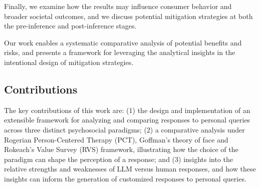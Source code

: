 Finally, we examine how the results may influence consumer behavior and broader societal outcomes, and we discuss potential mitigation strategies at both the pre-inference and post-inference stages.





Our work enables a systematic comparative analysis of potential benefits and risks, and presents a framework for leveraging the analytical insights in the intentional design of mitigation strategies.

\subsection{Contributions}
The key contributions of this work are: (1) the design and implementation of an extensible framework for analyzing and comparing responses to personal queries across three distinct psychosocial paradigms; (2) a comparative analysis under Rogerian Person-Centered Therapy (PCT), Goffman’s theory of face and Rokeach’s Value Survey (RVS) framework, illustrating how the choice of the paradigm can shape the perception of a response; and (3) insights into the relative strengths and weaknesses of LLM versus human responses, and how these insights can inform the generation of customized responses to personal queries.

